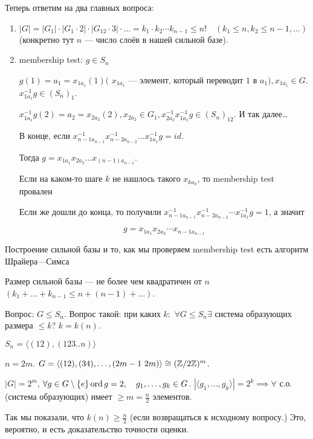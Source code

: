      Теперь ответим на два главных вопроса:
     \begin{enumerate}
         \item $|G| = |G_1| \cdot |G_1 \cdot 2| \cdot |G_{12} \cdot 3| \cdot \ldots = k_1 \cdot k_2 \cdots  k_{n-1} \le n! \quad (k_1 \le n, k_2 \le n-1, \ldots)$ (конкретно тут $n$ --- число слоёв в нашей сильной базе).

         \item membership test: $g \in S_n$

		 $g(1) = a_1 = x_{1a_1}(1) \text{( $x_{1a_1}$ --- элемент, который переводит 1 в $a_1$)} , x_{1a_1} \in G$. $x_{1a_1}^{-1} g \in (S_n)_1$.

        $x_{1a_1}^{-1}g(2) = a_2 = x_{2a_2}(2), x_{2a_2} \in G_1, x_{2a_2}^{-1}x_{1a_1}^{-1}g \in (S_n)_{12}$. И так далее\dots

             В конце, если $x_{n-1 a_{n-1}}^{-1} x_{n-2 a_{n-2}}^{-1} \ldots x_{1 a_1}^{-1} g= id$.

             Тогда $g = x_{1 a_1}x_{2 a_2}...x_{(n-1) a_{n-1}}$.

             Если на каком-то шаге $k$ не нашлось такого $x_{ka_k}$, то membership test провален

	     Если же дошли до конца, то получили $x_{n-1 a_{n-1}}^{-1} x_{n-2 a_{n-2}}^{-1} \cdots x_{1a_1}^{-1} g = 1$, а значит 

	     $$
	     g = x_{1a_1} x_{2a_2} \cdots x_{n-1 a_{n-1}}
	     $$
     \end{enumerate}

\begin{definition}
	Построение сильной базы и то, как мы проверяем membership test есть алгоритм Шрайера---Симса
\end{definition}
\begin{remark}
	Размер сильной базы --- не более чем квадратичен от $n$ $(k_1 + \ldots + k_{n-1} \le n + (n-1) + \ldots)$.
\end{remark}

Вопрос: $G \le S_n$. Вопрос такой: при каких $k\!:$ $\forall G \le S_n \exists$ система образующих размера $\le k$? $k = k(n)$.
\begin{exerc}
    $S_n = \langle (12), (123..n) \rangle$
\end{exerc}
\begin{example}
	$n = 2m$.  $G = \langle (12), (34), \ldots, (2m-1\ 2m)\rangle \cong (\Z / 2 \Z)^m$.

	$|G| = 2^m$,  $\forall g \in G\setminus\{e\} \operatorname{ord} g = 2, \quad g_1, \ldots, g_k \in G$. $|\langle g_1, \ldots, g_k \rangle| = 2^k \implies \forall$ с.о. (система образующих) имеет $\ge m = \frac{n}{2}$ элементов.

	Так мы показали, что $k(n) \ge \frac{n}2$ (если возвращаться к исходному вопросу.) Это, вероятно, и есть доказательство точности оценки.
\end{example}

